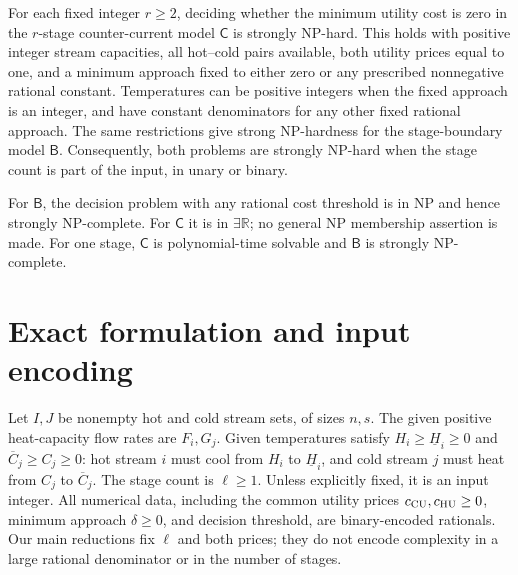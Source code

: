 \documentclass[11pt,a4paper]{report}
\newcommand{\CC}{\mathsf{C}}
\newcommand{\BB}{\mathsf{B}}
\newcommand{\ER}{\exists\mathbb{R}}
\begin{document}
\begin{theorem}\label{thm:main}
For each fixed integer $r\geq2$, deciding whether the minimum utility cost is
zero in the $r$-stage counter-current model $\CC$ is strongly NP-hard.
This holds with positive integer stream capacities, all hot--cold pairs
available, both utility prices equal to one, and a minimum approach fixed to
either zero or any prescribed nonnegative rational constant. Temperatures
can be positive integers when the fixed approach is an integer, and have
constant denominators for any other fixed rational approach. The same
restrictions give strong NP-hardness
for the stage-boundary model $\BB$. Consequently, both problems are strongly
NP-hard when the stage count is part of the input, in unary or binary.

For $\BB$, the decision problem with any rational cost threshold is in NP
and hence strongly NP-complete. For $\CC$ it is in $\ER$; no general NP
membership assertion is made. For one stage, $\CC$ is polynomial-time
solvable and $\BB$ is strongly NP-complete.
\end{theorem}

\section{Exact formulation and input encoding}
Let $I,J$ be nonempty hot and cold stream sets, of sizes $n,s$. The given
positive heat-capacity flow rates are $F_i,G_j$. Given temperatures satisfy
$H_i\geq\underline H_i\geq0$ and $\overline C_j\geq C_j\geq0$:
hot stream $i$ must cool from $H_i$ to $\underline H_i$, and cold stream $j$
must heat from $C_j$ to $\overline C_j$. The stage count is $\ell\geq1$.
Unless explicitly fixed, it is an input integer. All numerical data, including
the common utility prices $c_{\rm CU},c_{\rm HU}\geq0$, minimum approach
$\delta\geq0$, and decision threshold, are binary-encoded rationals.
Our main reductions fix $\ell$ and both prices; they do not encode complexity
in a large rational denominator or in the number of stages.
\end{document}
